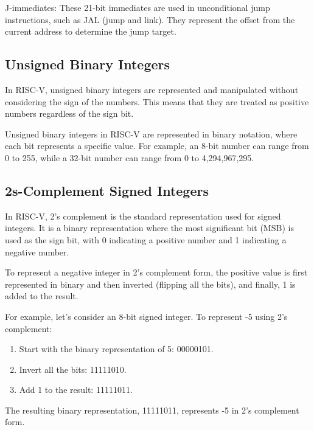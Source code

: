             J-immediates: These 21-bit immediates are used in unconditional jump instructions, such as JAL (jump and link). They represent the offset from the current address to determine the jump target.
        
        \subsection{Unsigned Binary Integers}
        
            In RISC-V, unsigned binary integers are represented and manipulated without considering the sign of the numbers. This means that they are treated as positive numbers regardless of the sign bit.
            
            Unsigned binary integers in RISC-V are represented in binary notation, where each bit represents a specific value. For example, an 8-bit number can range from 0 to 255, while a 32-bit number can range from 0 to 4,294,967,295.
        
        \subsection{2s-Complement Signed Integers}
        
            In RISC-V, 2's complement is the standard representation used for signed integers. It is a binary representation where the most significant bit (MSB) is used as the sign bit, with 0 indicating a positive number and 1 indicating a negative number.
            
            To represent a negative integer in 2's complement form, the positive value is first represented in binary and then inverted (flipping all the bits), and finally, 1 is added to the result.
            
            For example, let's consider an 8-bit signed integer. To represent -5 using 2's complement:
            
            \begin{enumerate}
            \item Start with the binary representation of 5: 00000101.
            \item Invert all the bits: 11111010.
            \item Add 1 to the result: 11111011.
            \end{enumerate}
            The resulting binary representation, 11111011, represents -5 in 2's complement form.\\
            
